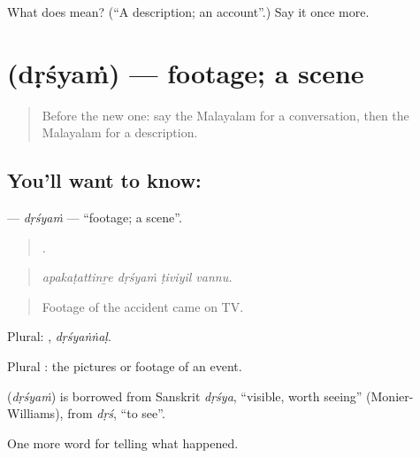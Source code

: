 \begin{tcolorbox}[breakable,colback=teal!4,colframe=teal!35!black,title={Before you move on}]
What does  mean? (\textquotedblleft{}A description; an account\textquotedblright{}.) Say it once more.
\end{tcolorbox}
\section[\texorpdfstring{\ml{ദൃശ്യം} (dṛśyaṁ)}{ദൃശ്യം (dṛśyaṁ)}]{ (dṛśyaṁ) — footage; a scene}

\label{lesson:ML-C356-drsyam}



\begin{quote}
Before the new one: say the Malayalam for a conversation, then the Malayalam for a description.
\end{quote}

\subsection*{You'll want to know: }
\textbf{} — \emph{dṛśyaṁ} — \textquotedblleft{}footage; a scene\textquotedblright{}.

\begin{quote}
   .
\end{quote}

\begin{quote}
\emph{apakaṭattinṟe dṛśyaṁ ṭiviyil vannu.}
\end{quote}

\begin{quote}
Footage of the accident came on TV.
\end{quote}

Plural: , \emph{dṛśyaṅṅaḷ}.

Plural : the pictures or footage of an event.

\begin{cousinweb}
\textbf{} (\emph{dṛśyaṁ}) is borrowed from Sanskrit \emph{dṛśya}, \textquotedblleft{}visible, worth seeing\textquotedblright{} (Monier-Williams), from \emph{dṛś}, \textquotedblleft{}to see\textquotedblright{}.
\end{cousinweb}

\begin{grammarlens}[title={What you've built}]
One more word for telling what happened.
\end{grammarlens}

